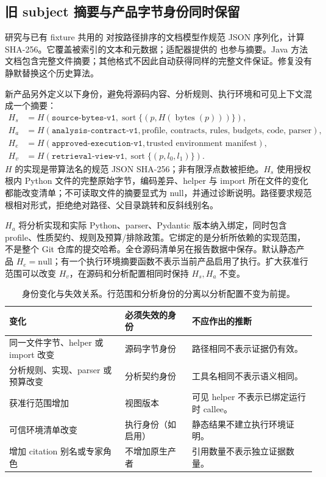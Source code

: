 \subsection{旧 subject 摘要与产品字节身份同时保留}
研究与已有 fixture 共用的  对按路径排序的文档模型作规范 JSON 序列化，计算 SHA-256。它覆盖被索引的文本和元数据；适配器提供的  也参与摘要。Java 方法文档包含完整文件摘要；其他格式不因此自动获得同样的完整文件保证。修复没有静默替换这个历史算法。

新产品另外定义以下身份，避免将源码内容、分析规则、执行环境和可见上下文混成一个摘要：
\begin{align}
H_s &= H(\texttt{source-bytes-v1},\operatorname{sort}\{(p,H(\operatorname{bytes}(p)))\}),\\
H_a &= H(\texttt{analysis-contract-v1},\text{profile, contracts, rules, budgets, code, parser}),\\
H_e &= H(\texttt{approved-execution-v1},\text{trusted environment manifest}),\\
H_v &= H(\texttt{retrieval-view-v1},\operatorname{sort}\{(p,l_0,l_1)\}).
\end{align}
$H$ 的实现是带算法名的规范 JSON SHA-256；非有限浮点数被拒绝。$H_s$ 使用授权根内 Python 文件的完整原始字节，编码差异、helper 与 import 所在文件的变化都能改变清单；不可读取文件的摘要显式为 null，并通过诊断说明。路径要求规范根相对形式，拒绝绝对路径、父目录跳转和反斜线别名。

$H_a$ 将分析实现和实际 Python、parser、Pydantic 版本纳入绑定，同时包含 profile、性质契约、规则及预算/排除政策。它绑定的是分析所依赖的实现范围，不是整个 Git 仓库的提交哈希。全仓源码清单另在报告数据中保存。默认静态产品 $H_e=\mathrm{null}$；有一个执行环境摘要函数不表示当前产品启用了执行。扩大获准行范围可以改变 $H_v$，在源码和分析配置相同时保持 $H_s,H_a$ 不变。

\begin{table}[htbp]\centering\small
\begin{tabularx}{\textwidth}{L{35mm}L{40mm}Y}
\toprule 变化 & 必须失效的身份 & 不应作出的推断\\\midrule
同一文件字节、helper 或 import 改变 & 源码字节身份 & 路径相同不表示证据仍有效。\\
分析规则、实现、parser 或预算改变 & 分析契约身份 & 工具名相同不表示语义相同。\\
获准行范围增加 & 视图版本 & 可见 helper 不表示已绑定运行时 callee。\\
可信环境清单改变 & 执行身份（如启用） & 静态结果不建立执行环境证明。\\
增加 citation 别名或专家角色 & 不增加原生产者 & 引用数量不表示独立证据数量。\\
\bottomrule\end{tabularx}
\caption{身份变化与失效关系。行范围和分析身份的分离以分析配置不变为前提。}
\end{table}

